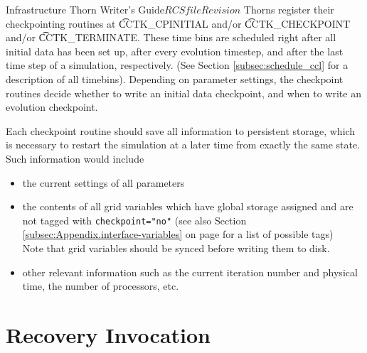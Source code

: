 \begin{cactuspart}{Infrastructure Thorn Writer's Guide}{$RCSfile$}{$Revision$}
Thorns register their checkpointing routines at {\t CCTK\_CPINITIAL} and/or
{\t CCTK\_CHECKPOINT} and/or {\t CCTK\_TERMINATE}. These time bins are
scheduled right after all initial data has been set up, after every
evolution timestep, and after the last time step of a simulation,
respectively. (See Section \ref{subsec:schedule_ccl} for a description of all timebins).
Depending on
parameter settings, the checkpoint routines decide whether to write an initial
data checkpoint, and when to write an evolution checkpoint.

Each checkpoint routine should save all information to persistent storage, which
is necessary to restart the simulation at a later time from exactly the same
state. Such information would include
%
\begin{itemize}
  \item the current settings of all parameters
  \item the contents of all grid variables which have global storage assigned
    and are not tagged with {\tt checkpoint="no"} (see also Section \ref{subsec:Appendix.interface-variables} on page \pageref{subsec:Appendix.interface-variables} for a list of possible tags)\\
    Note that grid variables should be synced before writing them to disk.
  \item other relevant information such as the current iteration number and
    physical time, the number of processors, etc.
\end{itemize}


\section{Recovery Invocation}


\end{cactuspart}
